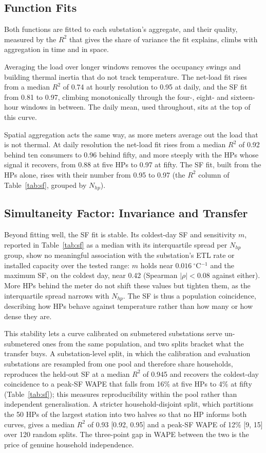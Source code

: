 \documentclass[9pt,journal,a4]{IEEEtran}
\begin{document}
\subsection{Function Fits}
\label{sec:res-ff}

Both functions are fitted to each substation's aggregate, and their quality, measured by the $R^2$ that gives the share of variance the fit explains, climbs with aggregation in time and in space.

Averaging the load over longer windows removes the occupancy swings and building thermal inertia that do not track temperature. The net-load fit rises from a median $R^2$ of 0.74 at hourly resolution to 0.95 at daily, and the SF fit from 0.81 to 0.97, climbing monotonically through the four-, eight- and sixteen-hour windows in between. The daily mean, used throughout, sits at the top of this curve.

Spatial aggregation acts the same way, as more meters average out the load that is not thermal. At daily resolution the net-load fit rises from a median $R^2$ of 0.92 behind ten consumers to 0.96 behind fifty, and more steeply with the HPs whose signal it recovers, from 0.88 at five HPs to 0.97 at fifty. The SF fit, built from the HPs alone, rises with their number from 0.95 to 0.97 (the $R^2$ column of Table~\ref{tab:sf}, grouped by $N_{hp}$).


\subsection{Simultaneity Factor: Invariance and Transfer}
\label{sec:res-sf}

Beyond fitting well, the SF fit is stable. Its coldest-day SF and sensitivity $m$, reported in Table~\ref{tab:sf} as a median with its interquartile spread per $N_{hp}$ group, show no meaningful association with the substation's ETL rate or installed capacity over the tested range: $m$ holds near $0.016~^\circ$C$^{-1}$ and the maximum SF, on the coldest day, near 0.42 (Spearman $|\rho| < 0.08$ against either). More HPs behind the meter do not shift these values but tighten them, as the interquartile spread narrows with $N_{hp}$. The SF is thus a population coincidence, describing how HPs behave against temperature rather than how many or how dense they are.

This stability lets a curve calibrated on submetered substations serve un-submetered ones from the same population, and two splits bracket what the transfer buys. A substation-level split, in which the calibration and evaluation substations are resampled from one pool and therefore share households, reproduces the held-out SF at a median $R^2$ of 0.945 and recovers the coldest-day coincidence to a peak-SF WAPE that falls from 16\% at five HPs to 4\% at fifty (Table~\ref{tab:sf}); this measures reproducibility within the pool rather than independent generalisation. A stricter household-disjoint split, which partitions the 50 HPs of the largest station into two halves so that no HP informs both curves, gives a median $R^2$ of 0.93 [0.92, 0.95] and a peak-SF WAPE of 12\% [9, 15] over 120 random splits. The three-point gap in WAPE between the two is the price of genuine household independence.
\end{document}
